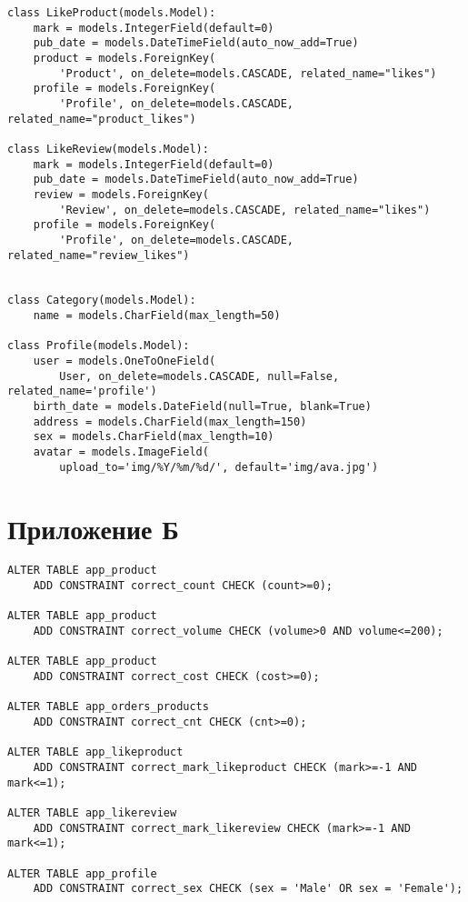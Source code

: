 \captionsetup{singlelinecheck = false, justification=raggedright}
\begin{lstlisting}[label=db_create_2,caption=Классы таблиц базы данных(часть 2)]
class LikeProduct(models.Model):
    mark = models.IntegerField(default=0)
    pub_date = models.DateTimeField(auto_now_add=True)
    product = models.ForeignKey(
        'Product', on_delete=models.CASCADE, related_name="likes")
    profile = models.ForeignKey(
        'Profile', on_delete=models.CASCADE, related_name="product_likes")

class LikeReview(models.Model):
    mark = models.IntegerField(default=0)
    pub_date = models.DateTimeField(auto_now_add=True)
    review = models.ForeignKey(
        'Review', on_delete=models.CASCADE, related_name="likes")
    profile = models.ForeignKey(
        'Profile', on_delete=models.CASCADE, related_name="review_likes")


class Category(models.Model):
    name = models.CharField(max_length=50)

class Profile(models.Model):
    user = models.OneToOneField(
        User, on_delete=models.CASCADE, null=False, related_name='profile')
    birth_date = models.DateField(null=True, blank=True)
    address = models.CharField(max_length=150)
    sex = models.CharField(max_length=10)
    avatar = models.ImageField(
        upload_to='img/%Y/%m/%d/', default='img/ava.jpg')
\end{lstlisting}

\newpage

\chapter*{Приложение Б}

\captionsetup{singlelinecheck = false, justification=raggedright}
\begin{lstlisting}[label=constraints,caption=Создание ограничений на таблицы]
ALTER TABLE app_product
    ADD CONSTRAINT correct_count CHECK (count>=0);

ALTER TABLE app_product
    ADD CONSTRAINT correct_volume CHECK (volume>0 AND volume<=200);

ALTER TABLE app_product
    ADD CONSTRAINT correct_cost CHECK (cost>=0);

ALTER TABLE app_orders_products
    ADD CONSTRAINT correct_cnt CHECK (cnt>=0);

ALTER TABLE app_likeproduct
    ADD CONSTRAINT correct_mark_likeproduct CHECK (mark>=-1 AND mark<=1);

ALTER TABLE app_likereview
    ADD CONSTRAINT correct_mark_likereview CHECK (mark>=-1 AND mark<=1);

ALTER TABLE app_profile
    ADD CONSTRAINT correct_sex CHECK (sex = 'Male' OR sex = 'Female');
\end{lstlisting}

